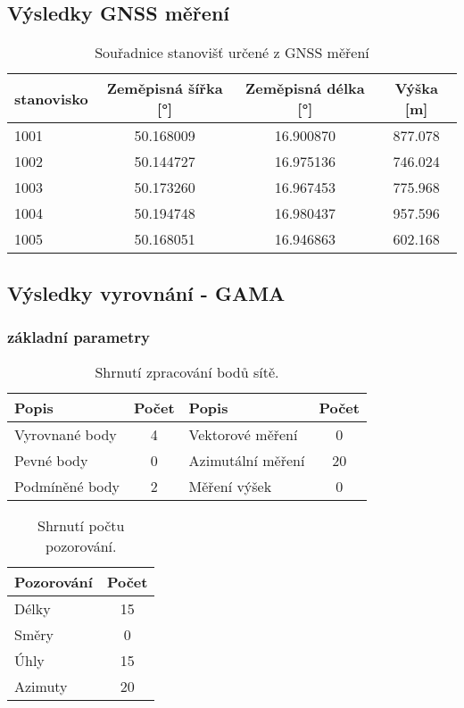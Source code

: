 \subsection{Výsledky GNSS měření}

\begin{table}[H]
\centering
\caption{Souřadnice stanovišť určené z GNSS měření}
\label{tab:gnss_coords}
\begin{tabular}{lccc}
\hline
\textbf{stanovisko} & \textbf{Zeměpisná šířka} [°] & \textbf{Zeměpisná délka} [°] & \textbf{Výška [m]} \\
\hline
1001 & 50.168009 & 16.900870 & 877.078 \\
1002 & 50.144727 & 16.975136 & 746.024 \\
1003 & 50.173260 & 16.967453 & 775.968 \\
1004 & 50.194748 & 16.980437 & 957.596 \\
1005 & 50.168051 & 16.946863 & 602.168 \\
\hline
\end{tabular}
\end{table}

\subsection{Výsledky vyrovnání - GAMA}
\subsubsection{základní parametry}
\begin{table}[H]
    \centering
    \caption{Shrnutí zpracování bodů sítě.}
    \begin{tabular}{@{} l S[table-format=2.0] l S[table-format=2.0] @{}}
    \toprule
    \textbf{Popis} & \textbf{Počet} & \textbf{Popis} & \textbf{Počet} \\
    \midrule
    Vyrovnané body & 4 & Vektorové měření & 0 \\
    Pevné body & 0 & Azimutální měření & 20 \\
    Podmíněné body & 2 & Měření výšek & 0 \\
    \bottomrule
    \end{tabular}
    \label{tab:points_summary_vse}
\end{table}

\begin{table}[H]
    \centering
    \caption{Shrnutí počtu pozorování.}
    \begin{tabular}{@{} l S[table-format=2.0] @{}}
    \toprule
    \textbf{Pozorování} & \textbf{Počet} \\
    \midrule
    Délky & 15 \\
    Směry & 0 \\
    Úhly & 15 \\
    Azimuty & 20 \\
    \bottomrule
    \end{tabular}
    \label{tab:obs_summary_vse}
\end{table}

